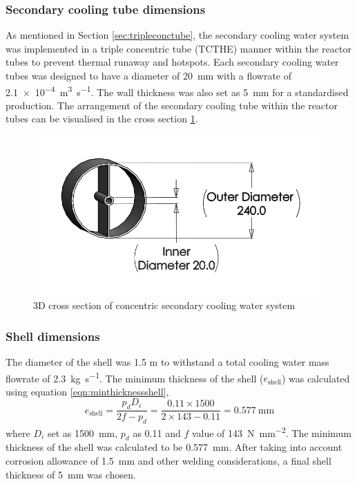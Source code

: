 \subsubsection{Secondary cooling tube dimensions}
As mentioned in Section \ref{sec:tripleconctube}, the secondary cooling water system was implemented in a triple concentric tube (TCTHE) manner within the reactor tubes to prevent thermal runaway and hotspots. Each secondary cooling water tubes was designed to have a diameter of \SI{20}{\milli \metre} with a flowrate of \SI{2.1e-4}{\cubic\m\per\s}. The wall thickness was also set as \SI{5}{\milli \metre} for a standardised production. 
The arrangement of the secondary cooling tube within the reactor tubes can be visualised in the cross section \cref{fig:concentriccoolingwater}. 
\begin{figure}[H]
    \centering
    \includegraphics[width=0.65\linewidth]{chapters/2-reaction/figures/FYD conc tube with calc bw.png} 
    \caption{3D cross section of concentric secondary cooling water system}
    \label{fig:concentriccoolingwater}
\end{figure}

\subsubsection{Shell dimensions}
The diameter of the shell was 1.5 m to withstand a total cooling water mass flowrate of \SI{2.3}{\kilogram \per \second}.
The minimum thickness of the shell ($e_\mathrm{shell}$) was calculated using equation \cref{eqn:minthicknessshell},
\begin{equation}
    e_\mathrm{shell} = \frac{p_dD_i}{2f-p_d} = \frac{0.11 \times 1500}{2 \times 143 - 0.11} = \SI{0.577}{\mm}
    \label{eqn:minthicknessshell}
\end{equation}
where $D_i$ set as \SI{1500}{\milli \metre}, $p_d$ as 0.11 and $f$ value of \SI{143}{\N\per\square\mm}. The minimum thickness of the shell was calculated to be \SI{0.577}{\milli \metre}. After taking into account corrosion allowance of \SI{1.5}{\milli \metre} and other welding considerations, a final shell thickness of \SI{5}{\milli \metre} was chosen. 

